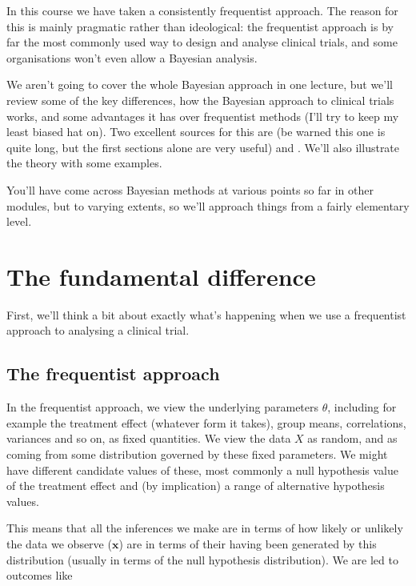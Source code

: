 \documentclass[
  openany]{book}
\theoremstyle{definition}
\theoremstyle{definition}
\theoremstyle{definition}
\theoremstyle{definition}
\theoremstyle{remark}
\begin{document}
In this course we have taken a consistently frequentist approach. The reason for this is mainly pragmatic rather than ideological: the frequentist approach is by far the most commonly used way to design and analyse clinical trials, and some organisations won't even allow a Bayesian analysis.

We aren't going to cover the whole Bayesian approach in one lecture, but we'll review some of the key differences, how the Bayesian approach to clinical trials works, and some advantages it has over frequentist methods (I'll try to keep my least biased hat on). Two excellent sources for this are \citet{spiegelhalter1994bayesian} (be warned this one is quite long, but the first sections alone are very useful) and \citet{berry2006bayesian}. We'll also illustrate the theory with some examples.

You'll have come across Bayesian methods at various points so far in other modules, but to varying extents, so we'll approach things from a fairly elementary level.

\section{The fundamental difference}\label{the-fundamental-difference}

First, we'll think a bit about exactly what's happening when we use a frequentist approach to analysing a clinical trial.

\subsection*{The frequentist approach}\label{the-frequentist-approach}

In the frequentist approach, we view the underlying parameters \(\theta\), including for example the treatment effect (whatever form it takes), group means, correlations, variances and so on, as fixed quantities. We view the data \(X\) as random, and as coming from some distribution governed by these fixed parameters. We might have different candidate values of these, most commonly a null hypothesis value of the treatment effect and (by implication) a range of alternative hypothesis values.

This means that all the inferences we make are in terms of how likely or unlikely the data we observe (\(\mathbf{x}\)) are in terms of their having been generated by this distribution (usually in terms of the null hypothesis distribution). We are led to outcomes like
\end{document}
